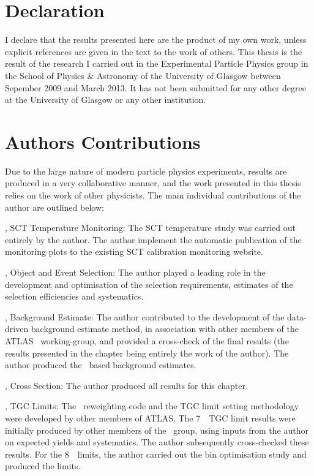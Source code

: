 \chapter*{Declaration}
I declare that the results presented here are the product of my own work, unless
explicit references are given in the text to the work of others. This thesis is
the result of the research I carried out in the Experimental Particle Physics
group in the School of Physics \& Astronomy of the University of Glasgow between
Sepember 2009 and March 2013. It has not been submitted for any other degree
at the University of Glasgow or any other institution.

\chapter*{Authors Contributions}

Due to the large nature of modern particle physics experiments, results are produced in a very collaborative
manner, and the work presented in this thesis relies on the work of other
physicists. The main individual contributions of the author are outlined below:

, SCT Temperature Monitoring: The SCT temperature study was
carried out entirely by the author. The author implement the automatic
publication of the monitoring plots to the existing SCT calibration monitoring
website.

, Object and Event Selection: The author played a
leading role in the development and optimisation of the selection requirements,
estimates of the selection efficiencies and systematics.

, Background Estimate: The author contributed to the 
development of the data-driven background estimate method, in association with other members
of the ATLAS \ZZ\ working-group, and provided a cross-check of the final
results (the results presented in the chapter being entirely the work of the
author). The author produced the \mc\ based background estimates.

, Cross Section: The author produced all results for
this chapter.

, TGC Limits: The \AfterBurner\ reweighting code and the TGC
limit setting methodology were developed by other members of 
ATLAS. The 7~\tev\ TGC limit results were initially produced by
other members of the \ZZ\ group, using inputs from the author on expected
yields and systematics. The author subsequently cross-checked these results. For
the 8~\tev\ limits, the author carried out the bin optimisation study and
produced the limits.
